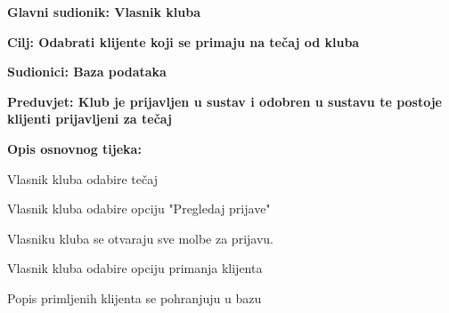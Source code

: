 						\noindent {}
						\begin{packed_item}
							
							\item \textbf{Glavni sudionik: Vlasnik kluba}
							\item  \textbf{Cilj: Odabrati klijente koji se primaju na tečaj od kluba} 
							\item  \textbf{Sudionici: Baza podataka}
							\item  \textbf{Preduvjet: Klub je prijavljen u sustav i odobren u sustavu te postoje klijenti prijavljeni za tečaj}
							\item  \textbf{Opis osnovnog tijeka: }
							
							\item[] \begin{packed_enum}
								
								\item Vlasnik kluba odabire tečaj
								\item Vlasnik kluba odabire opciju "Pregledaj prijave"
								\item Vlasniku kluba se otvaraju sve molbe za prijavu.
								\item Vlasnik kluba odabire opciju primanja klijenta
								\item Popis primljenih klijenta se pohranjuju u bazu
							\end{packed_enum}
							
							
							
						\end{packed_item}
					\newpage
						
